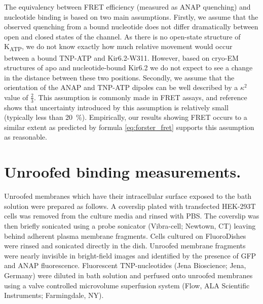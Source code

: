 The equivalency between FRET efficiency (measured as ANAP quenching) and nucleotide binding is based on two main assumptions.
Firstly, we assume that the observed quenching from a bound nucleotide does not differ dramatically between open and closed states of the channel.
As there is no open-state structure of K\textsubscript{ATP}, we do not know exactly how much relative movement would occur between a bound TNP-ATP and Kir6.2-W311.
However, based on cryo-EM structures of apo and nucleotide-bound Kir6.2 we do not expect to see a change in the distance between these two positions.
Secondly, we assume that the orientation of the ANAP and TNP-ATP dipoles can be well described by a $\kappa^2$ value of $\frac{2}{3}$.
This assumption is commonly made in FRET assays, and reference \cite{stryer_fluorescence_1978} shows that uncertainty introduced by this assumption is relatively small (typically less than \SI{20}{\percent}).
Empirically, our results showing FRET occurs to a similar extent as predicted by formula \ref{eq:forster_fret} supports this assumption as reasonable.

\section{Unroofed binding measurements.}
Unroofed membranes which have their intracellular surface exposed to the bath solution were prepared as follows.
A coverslip plated with transfected HEK-293T cells was removed from the culture media and rinsed with PBS.
The coverslip was then briefly sonicated using a probe sonicator (Vibra-cell; Newtown, CT) leaving behind adherent plasma membrane fragments.
Cells cultured on FluoroDishes were rinsed and sonicated directly in the dish.
Unroofed membrane fragments were nearly invisible in bright-field images and identified by the presence of GFP and ANAP fluorescence.
Fluorescent TNP-nucleotides (Jena Bioscience; Jena, Germany) were diluted in bath solution and perfused onto unroofed membranes using a valve controlled microvolume superfusion system (\si{\micro}Flow, ALA Scientific Instruments; Farmingdale, NY).

